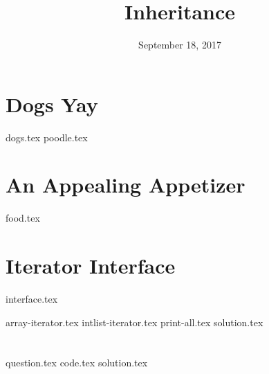 \documentclass[11pt]{exam}
\title{Inheritance}
\date{September 18, 2017}
\begin{document}
\maketitle

\section{Dogs Yay}
\begin{questions}
{dogs.tex}
{poodle.tex}
\end{questions}

\clearpage

\section{An Appealing Appetizer}
\begin{questions}
{food.tex}
\end{questions}

\clearpage

\section{Iterator Interface}
{interface.tex}
\begin{questions}
{array-iterator.tex}
\clearpage
{intlist-iterator.tex}
{print-all.tex}
{solution.tex}
\end{questions}

\clearpage

\section{}
\begin{questions}
{question.tex}
{code.tex}
{solution.tex}
\end{questions}
\end{document}
